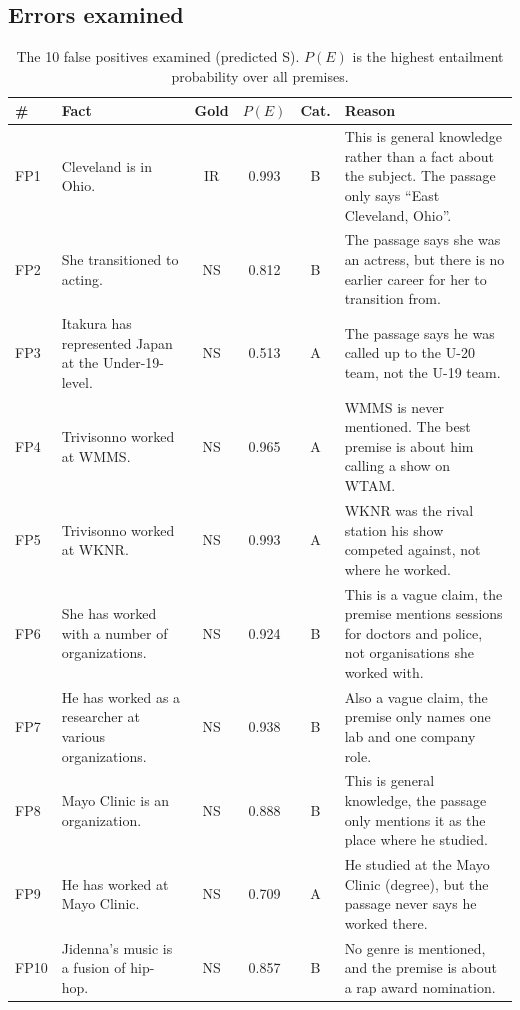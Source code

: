 \documentclass[12pt,a4paper]{article}
\begin{document}
\subsection{Errors examined}
\label{sec:examined}

\begin{table}[H]
\centering
\small
\begin{tabularx}{\linewidth}{l L{4.6cm} c c c Y}
\toprule
\# & Fact & Gold & $P(E)$ & Cat. & Reason \\
\midrule
FP1 & Cleveland is in Ohio. & IR & 0.993 & B & This is general knowledge rather than a fact about the subject. The passage only says ``East Cleveland, Ohio''. \\
FP2 & She transitioned to acting. & NS & 0.812 & B & The passage says she was an actress, but there is no earlier career for her to transition from. \\
FP3 & Itakura has represented Japan at the Under-19-level. & NS & 0.513 & A & The passage says he was called up to the U-20 team, not the U-19 team. \\
FP4 & Trivisonno worked at WMMS. & NS & 0.965 & A & WMMS is never mentioned. The best premise is about him calling a show on WTAM. \\
FP5 & Trivisonno worked at WKNR. & NS & 0.993 & A & WKNR was the rival station his show competed against, not where he worked. \\
FP6 & She has worked with a number of organizations. & NS & 0.924 & B & This is a vague claim, the premise mentions sessions for doctors and police, not organisations she worked with. \\
FP7 & He has worked as a researcher at various organizations. & NS & 0.938 & B & Also a vague claim, the premise only names one lab and one company role. \\
FP8 & Mayo Clinic is an organization. & NS & 0.888 & B & This is general knowledge, the passage only mentions it as the place where he studied. \\
FP9 & He has worked at Mayo Clinic. & NS & 0.709 & A & He studied at the Mayo Clinic (degree), but the passage never says he worked there. \\
FP10 & Jidenna's music is a fusion of hip-hop. & NS & 0.857 & B & No genre is mentioned, and the premise is about a rap award nomination. \\
\bottomrule
\end{tabularx}
\caption{The 10 false positives examined (predicted S). $P(E)$ is the highest entailment probability over all premises.}
\label{tab:fps}
\end{table}
\end{document}

